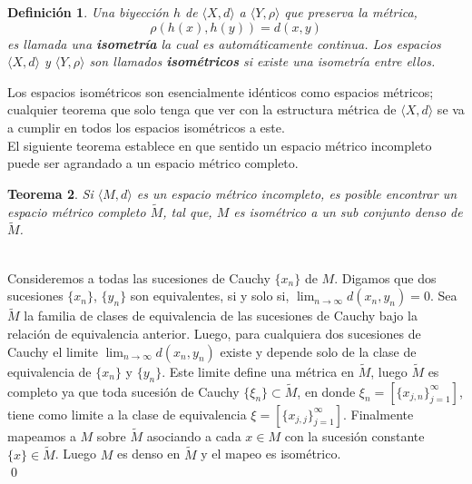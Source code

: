\documentclass[12pt]{book}
\numberwithin{equation}{chapter}
\newtheorem{theorem}{Teorema}[chapter]
\newtheorem{definition}[theorem]{Definici\'on}
\def\n{\noindent}
\def\la{\langle}
\def\ra{\rangle}
\def\rar{\rightarrow}
\def\r{\rho}
\begin{document}
\begin{definition}
Una biyecci\'on $h$ de $ \la X,d \ra $ a $ \la Y , \r \ra $ que preserva la m\'etrica,
$$ \r (h(x),h(y)) = d(x,y) $$ 
es llamada una {\bf isometr\'ia} la cual es autom\'aticamente continua. Los espacios $\la X , d \ra$ y $\la Y , \r \ra$ son llamados {\bf isom\'etricos} si existe una isometr\'ia entre ellos.
\end{definition}

Los espacios isom\'etricos son esencialmente id\'enticos como espacios m\'etricos; cualquier teorema que solo tenga que ver con la estructura m\'etrica de $ \la X,d \ra  $ se va a cumplir en todos los espacios isom\'etricos a este.\\
El siguiente teorema establece en que sentido un espacio m\'etrico incompleto puede ser agrandado a un espacio m\'etrico completo.
\begin{theorem}
Si $\la M , d \ra$ es un espacio m\'etrico incompleto, es posible encontrar un espacio m\'etrico completo $\tilde{M}$, tal que, $M$ es isom\'etrico a un sub conjunto denso de $\tilde{M}$.
\end{theorem}
\n {\bf Demostraci\'on (generalidades)}\\
Consideremos a todas las sucesiones de Cauchy $\{ x_{n} \}$ de $M$. Digamos que dos sucesiones $\{x_{n}\}$, $\{y_{n}\}$ son equivalentes, si y solo si, $\lim_{n \rar \infty} d(x_{n},y_{n})=0$. Sea $\tilde{M}$ la familia de clases de equivalencia de las sucesiones de Cauchy bajo la relaci\'on de equivalencia anterior. Luego, para cualquiera dos sucesiones de Cauchy el limite $ \lim_{n \rar \infty} d(x_{n},y_{n}) $ existe y depende solo de la clase de equivalencia de $\{ x_{n} \}$ y $\{ y_{n} \}$. Este limite define una m\'etrica en $\tilde{M}$, luego $\tilde{M}$ es completo ya que toda sucesi\'on de Cauchy $ \{ \xi_{n} \} \subset \tilde{M} $,  en donde $ \xi_{n}= \left[ \{x_{j,n}\}_{j=1}^{\infty} \right] $, tiene como limite a la clase de equivalencia $ \xi= \left[ \{ x_{j,j} \}_{j=1}^{\infty} \right] $. Finalmente mapeamos a $M$ sobre $\tilde{M}$ asociando a cada $x \in M$ con la sucesi\'on constante $ \{x\} \in \tilde{M} $. Luego $M$ es denso en $\tilde{M}$ y el mapeo es isom\'etrico.\\ \qed

\vspace{5 mm}
\end{document}
